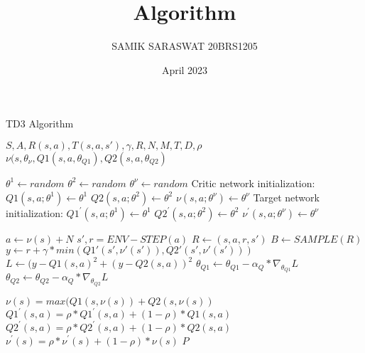 \documentclass{article}
\title{Algorithm}
\author{SAMIK SARASWAT 20BRS1205}
\date{April 2023}
\begin{document}
 \begin{algorithm}
 \caption{TD3 Algorithm}
 \begin{algorithmic}[1]
 \renewcommand{\algorithmicrequire}{\textbf{Input:}}
 \renewcommand{\algorithmicensure}{\textbf{Output:}}
 \REQUIRE $S, A, R(s, a), T(s, a, s'), \gamma, R, N, M, T, D, \rho$
 \ENSURE  $\nu(s, \theta_\nu, Q1(s, a, \theta_{Q1}), Q2(s, a, \theta_{Q2})$
 
 
  \STATE $\theta^1 \leftarrow random$
  \STATE $\theta^2 \leftarrow random$
  \STATE $\theta^{\nu} \leftarrow random$
  \STATE Critic network initialization:
  \STATE $Q1(s,a; \theta^1) \leftarrow \theta^1$
  \STATE $Q2(s,a; \theta^2) \leftarrow \theta^2$
  \STATE ${\nu}(s,a; \theta^{\nu}) \leftarrow \theta^{\nu}$
  \STATE Target network initialization:
  \STATE $Q1^{'}(s,a; \theta^1) \leftarrow \theta^1$
  \STATE $Q2^{'}(s,a; \theta^2) \leftarrow \theta^2$
  \STATE ${\nu}^{'}(s,a; \theta^{\nu}) \leftarrow \theta^{\nu}$
  
      \STATE $a \leftarrow \nu(s) + N$
      \STATE $s', r = ENV-STEP(a)$
      \STATE $R \leftarrow (s, a, r, s')$
      \STATE $B \leftarrow SAMPLE(R)$
      \STATE $y \leftarrow r + \gamma*min(Q1'(s', \nu'(s')), Q2'(s',\nu'(s')))$
      \STATE $L \leftarrow (y - Q1(s, a)^2 + (y - Q2(s, a))^2$
      \STATE $\theta_{Q1} \leftarrow \theta_{Q1} - \alpha_Q*\nabla_{\theta_{Q1}}L$ 
      \STATE $\theta_{Q2} \leftarrow \theta_{Q2} - \alpha_Q*\nabla_{\theta_{Q2}}L$ 
      
          \STATE $\nu(s) = max( Q1(s,\nu(s)) + Q2(s, \nu(s))$
          \STATE $Q1^{'}(s,a) = \rho*Q1^{'}(s,a) + (1- \rho) * Q1(s,a)$
          \STATE $Q2^{'}(s,a) =\rho*Q2^{'}(s,a) + (1- \rho) * Q2(s,a)$
          \STATE $\nu^{'}(s) =\rho* \nu^{'}(s) + (1-\rho) * \nu(s)$
      \ENDIF
    \ENDFOR
  \ENDFOR
 \RETURN $P$ 
 \end{algorithmic} 
 \end{algorithm}
\end{document}
